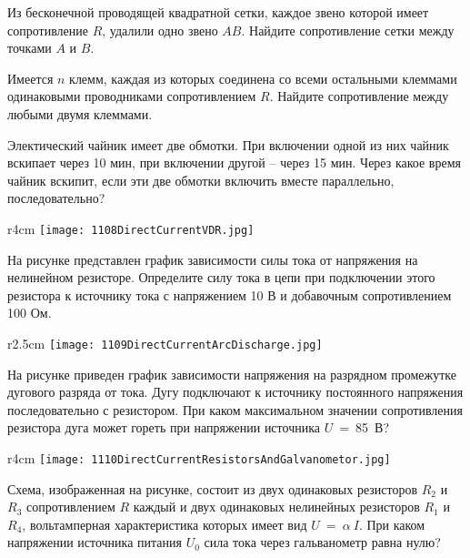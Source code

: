 \AddProb Из бесконечной проводящей квадратной сетки, каждое звено которой имеет сопротивление $R$, удалили одно звено $AB$. 
Найдите сопротивление сетки между точками $A$ и $B$.

\AddProb Имеется $n$ клемм, каждая из которых соединена со всеми остальными клеммами одинаковыми проводниками сопротивлением $R$. 
Найдите сопротивление между любыми двумя клеммами.

\AddProb Электический чайник имеет две обмотки. При включении одной из них чайник вскипает через 10 мин, при включении другой -- через 15 мин. 
Через какое время чайник вскипит, если эти две обмотки включить вместе параллельно, последовательно?

\begin{wrapfigure}{r}{4cm}
\texttt{[image: 1108DirectCurrentVDR.jpg]}
\end{wrapfigure}

\AddProb На рисунке представлен график зависимости силы тока от напряжения на нелинейном резисторе. 
Определите силу тока в цепи при подключении этого резистора к источнику тока с напряжением 10 В и добавочным сопротивлением 100 Ом.

\begin{wrapfigure}{r}{2.5cm}
\texttt{[image: 1109DirectCurrentArcDischarge.jpg]}
\end{wrapfigure}

\AddProb На рисунке приведен график зависимости напряжения на разрядном промежутке дугового разряда от тока. 
Дугу подключают  к источнику постоянного напряжения последовательно с резистором. 
При каком максимальном значении сопротивления резистора дуга может гореть при напряжении источника $U$~=~85~В?

\begin{wrapfigure}{r}{4cm}
\texttt{[image: 1110DirectCurrentResistorsAndGalvanometor.jpg]}
\end{wrapfigure}

\AddProb Схема, изображенная на рисунке, состоит из двух одинаковых резисторов $R_2$ и $R_3$ сопротивлением $R$ каждый 
и двух одинаковых нелинейных резисторов $R_1$ и $R_4$, вольтамперная характеристика которых имеет вид $U~=~\alpha~I$. 
При каком напряжении источника питания $U_0$ сила тока через гальванометр равна нулю?